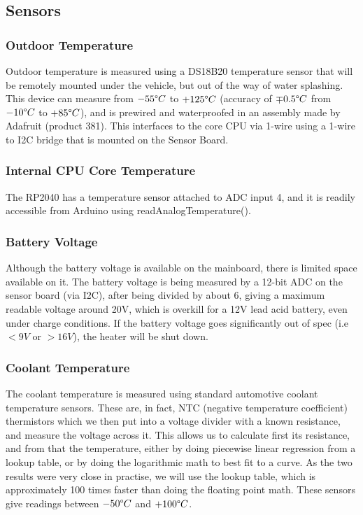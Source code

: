 \documentclass[lettersize,journal]{IEEEtran}
\begin{document}
\subsection{Sensors}
\subsubsection{Outdoor Temperature}
Outdoor temperature is measured using a DS18B20 temperature sensor that will be remotely mounted under the vehicle, but out of the way of water splashing.  This device can measure from $-55 \degree C$ to $+125 \degree C$ (accuracy of $\mp 0.5 \degree C$ from $-10 \degree C$ to $+85 \degree C$), and is prewired and waterproofed in an assembly made by Adafruit (product 381).  This interfaces to the core CPU via 1-wire using a 1-wire to I2C bridge that is mounted on the Sensor Board.

\subsubsection{Internal CPU Core Temperature}
The RP2040 has a temperature sensor attached to ADC input 4, and it is readily accessible from Arduino using readAnalogTemperature().

\subsubsection{Battery Voltage}
Although the battery voltage is available on the mainboard, there is limited space available on it.  The battery voltage is being measured by a 12-bit ADC on the sensor board (via I2C), after being divided by about 6, giving a maximum readable voltage around 20V, which is overkill for a 12V lead acid battery, even under charge conditions.  If the battery voltage goes significantly out of spec (i.e $< 9V$ or $> 16V$), the heater will be shut down.

\subsubsection{Coolant Temperature}
The coolant temperature is measured using standard automotive coolant temperature sensors.  These are, in fact, NTC (negative temperature coefficient) thermistors which we then put into a voltage divider with a known resistance, and measure the voltage across it.  This allows us to calculate first its resistance, and from that the temperature, either by doing piecewise linear regression from a lookup table, or by doing the logarithmic math to best fit to a curve.  As the two results were very close in practise, we will use the lookup table, which is approximately 100 times faster than doing the floating point math.  These sensors give readings between $-50 \degree C$ and $+100 \degree C$.
\end{document}
